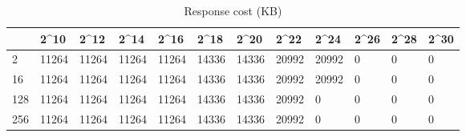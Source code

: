 \begin{table}
\caption{Response cost (KB)}
\label{tab:response_cost}
\begin{tabular}{llllllllllll}
\toprule
 & 2^{10} & 2^{12} & 2^{14} & 2^{16} & 2^{18} & 2^{20} & 2^{22} & 2^{24} & 2^{26} & 2^{28} & 2^{30} \\
\midrule
2 & 11264 & 11264 & 11264 & 11264 & 14336 & 14336 & 20992 & 20992 & 0 & 0 & 0 \\
16 & 11264 & 11264 & 11264 & 11264 & 14336 & 14336 & 20992 & 20992 & 0 & 0 & 0 \\
128 & 11264 & 11264 & 11264 & 11264 & 14336 & 14336 & 20992 & 0 & 0 & 0 & 0 \\
256 & 11264 & 11264 & 11264 & 11264 & 14336 & 14336 & 20992 & 0 & 0 & 0 & 0 \\
\bottomrule
\end{tabular}
\end{table}
